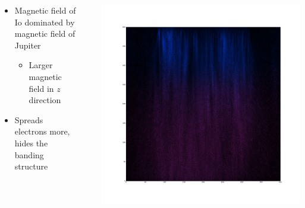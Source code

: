 \documentclass[xcolor=pdftex,dvipsnames,table,usenames,11pt]{beamer}
\newcommand{\subitem}[1]{\begin{itemize}\item #1\end{itemize}}
\begin{document}
\begin{frame}
\begin{columns}[onlytextwidth]
  \begin{column}{0.5\textwidth}
  \begin{itemize}
  
 \item Magnetic field of Io dominated by magnetic field of Jupiter
\subitem{Larger magnetic field in $z$ direction }
\item Spreads electrons more, hides the banding structure
  \end{itemize}
  \end{column}
  \begin{column}{0.05\textwidth}
  \end{column}
  \begin{column}{0.5\textwidth}
    \includegraphics[width=\textwidth]{img/io_first.png}\\
  \end{column}
\end{columns} 
\end{frame}
\end{document}
